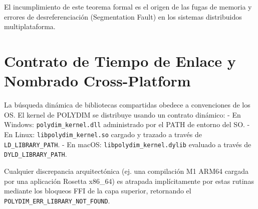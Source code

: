 El incumplimiento de este teorema formal es el origen de las fugas de memoria y errores de desreferenciación (Segmentation Fault) en los sistemas distribuidos multiplataforma.

\section{Contrato de Tiempo de Enlace y Nombrado Cross-Platform}
La búsqueda dinámica de bibliotecas compartidas obedece a convenciones de los OS. El kernel de POLYDIM se distribuye usando un contrato dinámico:
- En Windows: \texttt{polydim\_kernel.dll} administrado por el PATH de entorno del SO.
- En Linux: \texttt{libpolydim\_kernel.so} cargado y trazado a través de \texttt{LD\_LIBRARY\_PATH}.
- En macOS: \texttt{libpolydim\_kernel.dylib} evaluado a través de \texttt{DYLD\_LIBRARY\_PATH}.

Cualquier discrepancia arquitectónica (ej. una compilación M1 ARM64 cargada por una aplicación Rosetta x86\_64) es atrapada implícitamente por estas rutinas mediante los bloqueos FFI de la capa superior, retornando el \texttt{POLYDIM\_ERR\_LIBRARY\_NOT_FOUND}.

